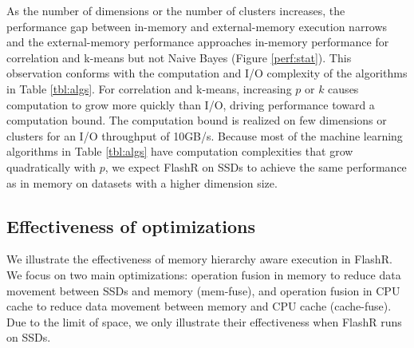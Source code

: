 As the number of dimensions or the number of clusters increases, the performance gap between
in-memory and external-memory execution narrows and the external-memory
performance approaches in-memory performance for correlation and k-means
but not Naive Bayes (Figure \ref{perf:stat}). This observation conforms with
the computation and I/O complexity of the algorithms in Table \ref{tbl:algs}.
For correlation and k-means, increasing $p$ or $k$ causes computation
to grow more quickly than I/O, driving performance toward a computation bound.
The computation bound is realized on few dimensions or clusters for an I/O throughput
of 10GB/s. Because most of the machine learning algorithms in Table \ref{tbl:algs} have
computation complexities that grow quadratically with $p$, we expect FlashR on SSDs to
achieve the same performance as in memory on datasets with a higher dimension size.


\subsection{Effectiveness of optimizations}
We illustrate the effectiveness of memory hierarchy aware execution in FlashR.
We focus on two main optimizations: operation fusion in memory
to reduce data movement between SSDs and memory (mem-fuse), and
operation fusion in CPU cache to reduce data movement between memory and
CPU cache (cache-fuse). Due to the limit of space, we only illustrate their
effectiveness when FlashR runs on SSDs.

